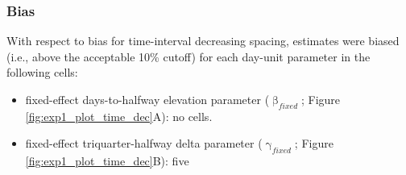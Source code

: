 \documentclass[
12pt, %
twoside,
english]{guelphthesis}
\begin{document}
\hypertarget{bias-time-dec-exp1}{%
\subsubsection{Bias}\label{bias-time-dec-exp1}}

With respect to bias for time-interval decreasing spacing, estimates were biased (i.e., above the acceptable 10\% cutoff) for each day-unit parameter in the following cells:
\begin{itemize}
\tightlist
\item
  fixed-effect days-to-halfway elevation parameter (\(\upbeta_{fixed}\); Figure \ref{fig:exp1_plot_time_dec}A): no cells.
\item
  fixed-effect triquarter-halfway delta parameter (\(\upgamma_{fixed}\); Figure \ref{fig:exp1_plot_time_dec}B): five
\end{itemize}
\end{document}
